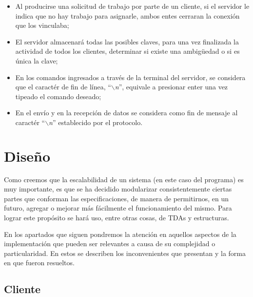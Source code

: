 \documentclass{article}
\begin{document}
\begin{itemize}
	\itemsep=3pt \topsep=0pt \partopsep=0pt \parskip=0pt \parsep=0pt

	\item Al producirse una solicitud de trabajo por parte de un cliente, si el servidor le indica que no hay trabajo para asignarle, ambos entes cerraran la conexión que los vinculaba;

	\item El servidor almacenará todas las posibles claves, para una vez finalizada la actividad de todos los clientes, determinar si existe una ambig\"uedad o si es única la clave;

	\item En los comandos ingresados a través de la terminal del servidor, se considera que el caractér de fin de línea, ``\textit{$\backslash$n}'', equivale a presionar enter una vez tipeado el comando deseado;

	\item En el envío y en la recepción de datos se considera como fin de mensaje al caractér ``\textit{$\backslash$n}'' establecido por el protocolo.
\end{itemize}
\medskip




\section{Diseño}

	Como creemos que la escalabilidad de un sistema (en este caso del programa) es muy importante, es que se ha decidido modularizar consistentemente ciertas partes que conforman las especificaciones, de manera de permitirnos, en un futuro, agregar o mejorar más fácilmente el funcionamiento del mismo. Para lograr este propósito se hará uso, entre otras cosas, de TDAs y estructuras.
	\par
	En los apartados que siguen pondremos la atención en aquellos aspectos de la implementación que pueden ser relevantes a causa de su complejidad o particularidad. En estos se describen los inconvenientes que presentan y la forma en que fueron resueltos.
\bigskip



\subsection{Cliente}

	\bigskip
\end{document}
